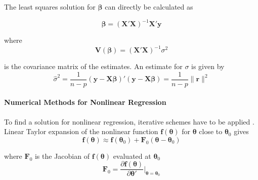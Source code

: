 The least squares solution for $\boldsymbol{\beta}$ can directly be calculated as

\begin{equation}
\label{eq:linear_ls_solution}
\boldsymbol{\beta} = (\mathbf{X}' \mathbf{X})^{-1} \mathbf{X}' \mathbf{y}
\end{equation}

where
\begin{equation}
\label{eq:linear_ls_covariance}
\mathbf{V} (\boldsymbol{\beta}) = (\mathbf{X}' \mathbf{X})^{-1} {\sigma}^2
\end{equation}

is the covariance matrix of the estimates. An estimate for ${\sigma}$ is given by
\begin{equation}
\hat{\sigma}^2
= \frac{1}{n-p} (\mathbf{y} - \mathbf{X} \boldsymbol{\beta})' (\mathbf{y} - \mathbf{X} \boldsymbol{\beta})
= \frac{1}{n-p} \| \mathbf{r} \|^2
\end{equation}

\paragraph{Numerical Methods for Nonlinear Regression\\}
To find a solution for nonlinear regression, iterative schemes have to be applied \citep{Seber}.
Linear Taylor expansion of the nonlinear function
$\mathbf{f}(\boldsymbol{\theta})$ 
for 
$\boldsymbol{\theta}$
close to 
$\boldsymbol{\theta}_0$
gives
\begin{equation}
\label{eq:linearized_f}
\mathbf{f}(\boldsymbol{\theta}) \approx
\mathbf{f}(\boldsymbol{\theta}_0) + \mathbf{F}_0(\boldsymbol{\theta} - \boldsymbol{\theta}_0)
\end{equation}

where $\mathbf{F}_0$ is the Jacobian of $\mathbf{f}(\boldsymbol{\theta})$ 
evaluated at $\boldsymbol{\theta}_0$
\begin{equation}
\mathbf{F}_0 = \frac{\partial \mathbf{f}(\boldsymbol{\theta})} {\partial \boldsymbol{\theta}'} \bigg|_{\boldsymbol{\theta} = \boldsymbol{\theta}_0}
\end{equation}


